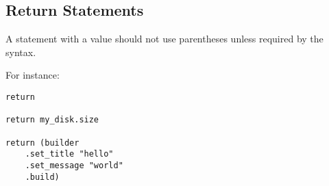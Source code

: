 \subsection{Return Statements}

A  statement with a value should not use parentheses unless required by the syntax.

\example For instance: 
\begin{lstlisting}
return

return my_disk.size

return (builder
    .set_title "hello"
    .set_message "world"
    .build)
\end{lstlisting}














